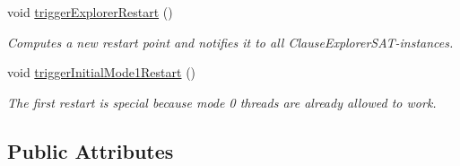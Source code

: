 \begin{DoxyCompactItemize}
void \hyperlink{classParallelLearner_a2b8e4330afb7e99c19d2d7da15c30cc3}{trigger\-Explorer\-Restart} ()
\begin{DoxyCompactList}\small\item\em Computes a new restart point and notifies it to all Clause\-Explorer\-S\-A\-T-\/instances. \end{DoxyCompactList}\item 
void \hyperlink{classParallelLearner_a9dab5d2c61ccedc139e1a8920833b16a}{trigger\-Initial\-Mode1\-Restart} ()
\begin{DoxyCompactList}\small\item\em The first restart is special because mode 0 threads are already allowed to work. \end{DoxyCompactList}\end{DoxyCompactItemize}
\subsection*{Public Attributes}
